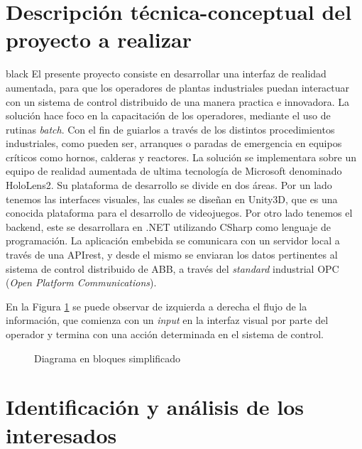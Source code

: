\documentclass[11pt]{charter}
\begin{document}
\section{Descripción técnica-conceptual del proyecto a realizar}
\label{sec:descripcion}

\begin{consigna}{black}
El presente proyecto consiste en desarrollar una interfaz de realidad aumentada, para que los operadores de plantas industriales puedan interactuar con un sistema de control distribuido de una manera practica e innovadora. La solución hace foco en la capacitación de los operadores, mediante el uso de rutinas \textit{batch}. Con el fin de guiarlos a través de los distintos procedimientos industriales, como pueden ser, arranques o paradas de emergencia en equipos críticos como hornos, calderas y reactores. La solución se implementara sobre un equipo de realidad aumentada de ultima tecnología de Microsoft denominado HoloLens2. Su plataforma de desarrollo se divide en dos áreas. Por un lado tenemos las interfaces visuales, las cuales se diseñan en Unity3D, que es una conocida plataforma para el desarrollo de videojuegos. Por otro lado tenemos el backend, este se desarrollara en .NET utilizando CSharp como lenguaje de programación. La aplicación embebida se comunicara con un servidor local a través de una APIrest, y desde el mismo se enviaran los datos pertinentes al sistema de control distribuido de ABB, a través del \textit{standard} industrial OPC (\textit{Open Platform Communications}).  

En la Figura \ref{fig:esquema_inicial} se puede observar de izquierda a derecha el flujo de la información, que comienza con un \textit{input} en la interfaz visual por parte del operador y termina con una acción determinada en el sistema de control.

\vspace{25px}

\begin{figure}[htpb]
    \centering
    \def\svgwidth{\columnwidth}
    \fontsize{8}{5}\selectfont
    
	\caption{Diagrama en bloques simplificado}
	\label{fig:esquema_inicial}
\end{figure}

\vspace{25px}

\end{consigna}


\section{Identificación y análisis de los interesados}
\label{sec:interesados}
\end{document}
